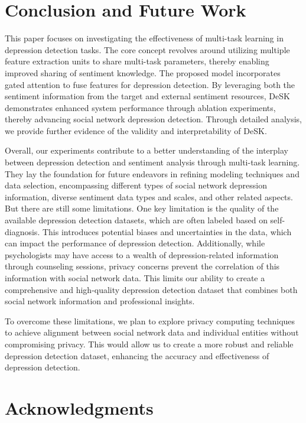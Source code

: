 \documentclass[runningheads]{llncs}
\begin{document}
\section{Conclusion and Future Work}
This paper focuses on investigating the effectiveness of multi-task learning in depression detection tasks. The core concept revolves around utilizing multiple feature extraction units to share multi-task parameters, thereby enabling improved sharing of sentiment knowledge. The proposed model incorporates gated attention to fuse features for depression detection. By leveraging both the sentiment information from the target and external sentiment resources, DeSK demonstrates enhanced system performance through ablation experiments, thereby advancing social network depression detection. Through detailed analysis, we provide further evidence of the validity and interpretability of DeSK.

Overall, our experiments contribute to a better understanding of the interplay between depression detection and sentiment analysis through multi-task learning. They lay the foundation for future endeavors in refining modeling techniques and data selection, encompassing different types of social network depression information, diverse sentiment data types and scales, and other related aspects. But there are still some limitations. One key limitation is the quality of the available depression detection datasets, which are often labeled based on self-diagnosis. This introduces potential biases and uncertainties in the data, which can impact the performance of depression detection. Additionally, while psychologists may have access to a wealth of depression-related information through counseling sessions, privacy concerns prevent the correlation of this information with social network data. This limits our ability to create a comprehensive and high-quality depression detection dataset that combines both social network information and professional insights. 

To overcome these limitations, we plan to explore privacy computing techniques to achieve alignment between social network data and individual entities without compromising privacy. This would allow us to create a more robust and reliable depression detection dataset, enhancing the accuracy and effectiveness of depression detection.



\section{Acknowledgments}
\end{document}
